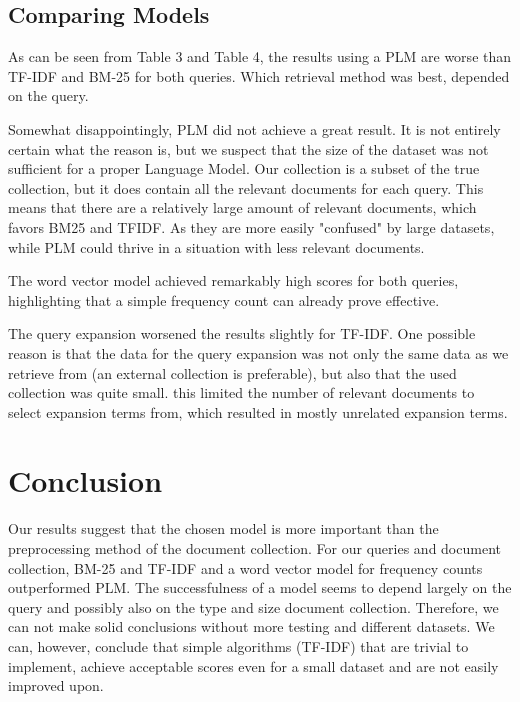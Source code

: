 \documentclass{article}
\begin{document}
\subsection*{Comparing Models}

As can be seen from Table 3 and Table 4, the results using a PLM are worse than TF-IDF and BM-25 for both queries. Which retrieval method was best, depended on the query.

Somewhat disappointingly, PLM did not achieve a great result. It is not entirely certain what the reason is, but we suspect that the size of the dataset was not sufficient for a proper Language Model. Our collection is a subset of the true collection, but it does contain all the relevant documents for each query. This means that there are a relatively large amount of relevant documents, which favors BM25 and TFIDF. As they are more easily "confused" by large datasets, while PLM could thrive in a situation with less relevant documents.

The word vector model achieved remarkably high scores for both queries, highlighting that a simple frequency count can already prove effective.

The query expansion worsened the results slightly for TF-IDF. One possible reason is that the data for the query expansion was not only the same data as we retrieve from (an external collection is preferable), but also that the used collection was quite small. this limited the number of relevant documents to select expansion terms from, which resulted in mostly unrelated expansion terms.

\section*{Conclusion}

Our results suggest that the chosen model is more important than the preprocessing method of the document collection. For our queries and document collection, BM-25 and TF-IDF and a word vector model for frequency counts outperformed PLM. The successfulness of a model seems to depend largely on the query and possibly also on the type and size document collection. Therefore, we can not make solid conclusions without more testing and different datasets. We can, however, conclude that simple algorithms (TF-IDF) that are trivial to implement, achieve acceptable scores even for a small dataset and are not easily improved upon.



\end{document}

